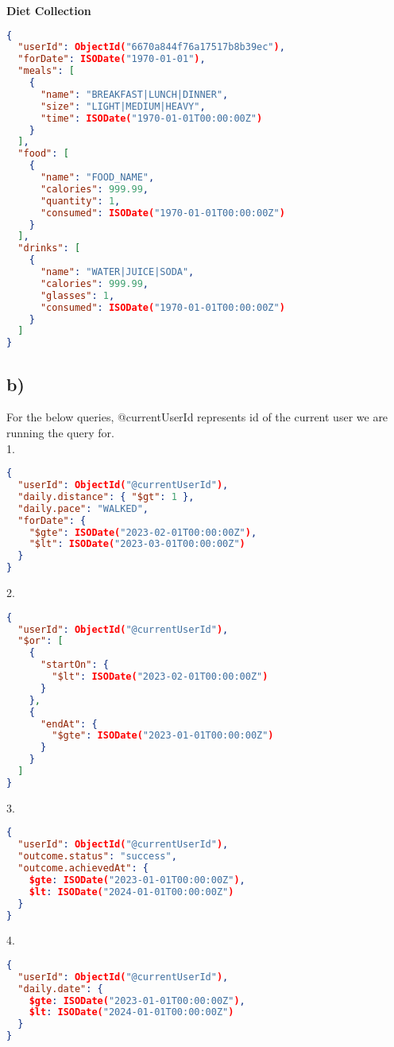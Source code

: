 \documentclass{article}
\begin{document}
\textbf{Diet Collection}
\begin{lstlisting}[language=json]
{
  "userId": ObjectId("6670a844f76a17517b8b39ec"),
  "forDate": ISODate("1970-01-01"),
  "meals": [
    {
      "name": "BREAKFAST|LUNCH|DINNER",
      "size": "LIGHT|MEDIUM|HEAVY",
      "time": ISODate("1970-01-01T00:00:00Z")
    }
  ],
  "food": [
    {
      "name": "FOOD_NAME",
      "calories": 999.99,
      "quantity": 1,
      "consumed": ISODate("1970-01-01T00:00:00Z")
    }
  ],
  "drinks": [
    {
      "name": "WATER|JUICE|SODA",
      "calories": 999.99,
      "glasses": 1,
      "consumed": ISODate("1970-01-01T00:00:00Z")
    }
  ]
}
\end{lstlisting} 
\pagebreak
\subsection*{\small b)}
For the below queries, @currentUserId represents id of the current user we are running the query for. \\
\newline
\hspace{0cm}1.
\begin{lstlisting}[language=json]
{ 
  "userId": ObjectId("@currentUserId"), 
  "daily.distance": { "$gt": 1 }, 
  "daily.pace": "WALKED",
  "forDate": {
    "$gte": ISODate("2023-02-01T00:00:00Z"),
    "$lt": ISODate("2023-03-01T00:00:00Z")
  }
}
\end{lstlisting} 
\hspace{0cm}2.
\begin{lstlisting}[language=json]
{
  "userId": ObjectId("@currentUserId"),
  "$or": [
    {
      "startOn": {
        "$lt": ISODate("2023-02-01T00:00:00Z")
      }
    },
    {
      "endAt": {
        "$gte": ISODate("2023-01-01T00:00:00Z")
      }
    }
  ]
}
\end{lstlisting}
\hspace{0cm}3. 
\begin{lstlisting}[language=json]
{
  "userId": ObjectId("@currentUserId"),
  "outcome.status": "success",
  "outcome.achievedAt": {
    $gte: ISODate("2023-01-01T00:00:00Z"),
    $lt: ISODate("2024-01-01T00:00:00Z")
  }
}
\end{lstlisting}
\hspace{0cm}4. 
\begin{lstlisting}[language=json]
{
  "userId": ObjectId("@currentUserId"),
  "daily.date": {
    $gte: ISODate("2023-01-01T00:00:00Z"),
    $lt: ISODate("2024-01-01T00:00:00Z")
  }
}
\end{lstlisting}
\end{document}
